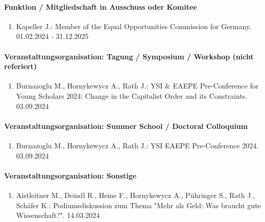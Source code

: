 \paragraph{Funktion / Mitgliedschaft in Ausschuss oder Komitee}
\begin{enumerate}[leftmargin=*, labelsep=0.5cm]
\item Kapeller J.: Member of the Equal Opportunities Commission for Germany. 01.02.2024 - 31.12.2025
\end{enumerate}
\paragraph{Veranstaltungsorganisation: Tagung / Symposium / Workshop (nicht referiert)}
\begin{enumerate}[leftmargin=*, labelsep=0.5cm]
\item Burnazoglu M., Hornykewycz A., Rath J.: YSI & EAEPE Pre-Conference for Young Scholars 2024: Change in the Capitalist Order and its Constraints. 03.09.2024
\end{enumerate}
\paragraph{Veranstaltungsorganisation: Summer School / Doctoral Colloquium}
\begin{enumerate}[leftmargin=*, labelsep=0.5cm]
\item Burnazoglu M., Hornykewycz A., Rath J.: YSI EAEPE Pre-Conference 2024. 03.09.2024
\end{enumerate}
\paragraph{Veranstaltungsorganisation: Sonstige}
\begin{enumerate}[leftmargin=*, labelsep=0.5cm]
\item Aistleitner M., Deindl R., Heine F., Hornykewycz A., Pühringer S., Rath J., Schäfer K.: Podiumsdiskussion zum Thema "Mehr als Geld: Was braucht gute Wissenschaft?". 14.03.2024
\end{enumerate}
